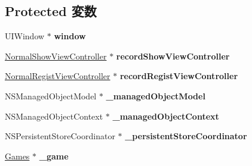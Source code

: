 \subsection*{Protected 変数}
\begin{DoxyCompactItemize}
\item 
\hypertarget{interface_go_clinic_app_delegate_a067ba370fb75e8f2a028f4ef935ab029}{
UIWindow $\ast$ {\bfseries window}}
\label{interface_go_clinic_app_delegate_a067ba370fb75e8f2a028f4ef935ab029}

\item 
\hypertarget{interface_go_clinic_app_delegate_a458051d45c11e8d28f964273116c4b43}{
\hyperlink{interface_normal_show_view_controller}{NormalShowViewController} $\ast$ {\bfseries recordShowViewController}}
\label{interface_go_clinic_app_delegate_a458051d45c11e8d28f964273116c4b43}

\item 
\hypertarget{interface_go_clinic_app_delegate_ae403a18d9fd68643f963e82475410af4}{
\hyperlink{interface_normal_regist_view_controller}{NormalRegistViewController} $\ast$ {\bfseries recordRegistViewController}}
\label{interface_go_clinic_app_delegate_ae403a18d9fd68643f963e82475410af4}

\item 
\hypertarget{interface_go_clinic_app_delegate_aced71d74ab745c874711663fb50b093a}{
NSManagedObjectModel $\ast$ {\bfseries \_\-managedObjectModel}}
\label{interface_go_clinic_app_delegate_aced71d74ab745c874711663fb50b093a}

\item 
\hypertarget{interface_go_clinic_app_delegate_a486afb5884da4c99713882ec58192985}{
NSManagedObjectContext $\ast$ {\bfseries \_\-managedObjectContext}}
\label{interface_go_clinic_app_delegate_a486afb5884da4c99713882ec58192985}

\item 
\hypertarget{interface_go_clinic_app_delegate_a356b9f708799fad8d71d4df33519f783}{
NSPersistentStoreCoordinator $\ast$ {\bfseries \_\-persistentStoreCoordinator}}
\label{interface_go_clinic_app_delegate_a356b9f708799fad8d71d4df33519f783}

\item 
\hypertarget{interface_go_clinic_app_delegate_a0c1b7bc380e29b5926cf54790d00ad47}{
\hyperlink{interface_games}{Games} $\ast$ {\bfseries \_\-game}}
\label{interface_go_clinic_app_delegate_a0c1b7bc380e29b5926cf54790d00ad47}

\end{DoxyCompactItemize}
